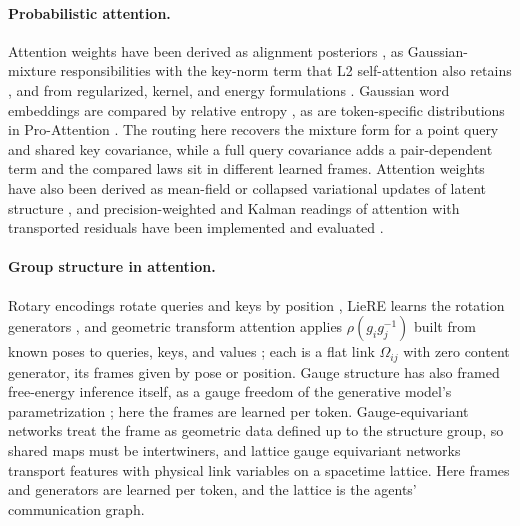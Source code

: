 \documentclass[twoside,11pt]{article}
\begin{document}
\paragraph{Probabilistic attention.} Attention weights have been derived as alignment posteriors \citep{Kim2017StructuredAttention,Deng2018LatentAlignment,Bahuleyan2018VariationalAttention,Fan2020BayesianAttention}, as Gaussian-mixture responsibilities with the key-norm term that L2 self-attention also retains \citep{Movellan2020ProbabilisticTransformers,Gabbur2021ProbabilisticAttention,Nguyen2022MGK,Kim2021Lipschitz}, and from regularized, kernel, and energy formulations \citep{Martins2016Sparsemax,Niculae2017Regularized,tsai2019transformer,ramsauer2021hopfield,Hoover2023EnergyTransformer}. Gaussian word embeddings are compared by relative entropy \citep{Vilnis2015Gaussian,Athiwaratkun2017Multimodal}, as are token-specific distributions in Pro-Attention \citep{Bae2022ProAttention}. The routing here recovers the mixture form for a point query and shared key covariance, while a full query covariance adds a pair-dependent term and the compared laws sit in different learned frames. Attention weights have also been derived as mean-field or collapsed variational updates of latent structure \citep{Singh2023ImplicitStructuralInference}, and precision-weighted and Kalman readings of attention with transported residuals have been implemented and evaluated \citep{Racioppo2025RobustFilter,Shaj2026KalmanLinear,Long2026PrecisionTracked}.

\paragraph{Group structure in attention.} Rotary encodings rotate queries and keys by position \citep{su2024roformer}, LieRE learns the rotation generators \citep{Ostmeier2025LieRE}, and geometric transform attention applies $\rho(g_ig_j^{-1})$ built from known poses to queries, keys, and values \citep{Miyato2024GTA}; each is a flat link $\Omega_{ij}$ with zero content generator, its frames given by pose or position. Gauge structure has also framed free-energy inference itself, as a gauge freedom of the generative model's parametrization \citep{Sengupta2016NeuronalGauge,sengupta2017gauge}; here the frames are learned per token. Gauge-equivariant networks \citep{cohen2019gauge,weiler2021coordinate,He2021GaugeEquivariantTransformer,fuchs2020se3,bronstein2021geometric} treat the frame as geometric data defined up to the structure group, so shared maps must be intertwiners, and lattice gauge equivariant networks \citep{Favoni2022LGECNN,Kanwar2020EquivariantFlow,Boyda2021SUNFlows} transport features with physical link variables on a spacetime lattice. Here frames and generators are learned per token, and the lattice is the agents' communication graph.
\end{document}
